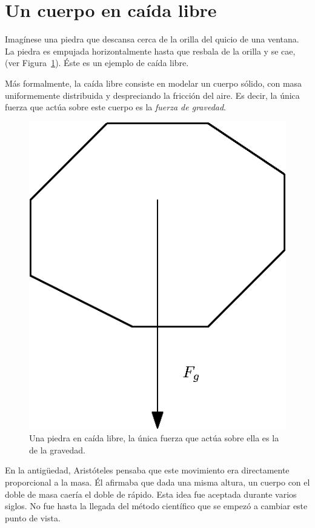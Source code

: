 \section{Un cuerpo en caída libre}
Imagínese una piedra que descansa cerca de la orilla del quicio de una ventana.
La piedra es empujada horizontalmente hasta que resbala de la orilla y se cae, (ver Figura~\ref{piedra:fig}).
Éste es un ejemplo de caída libre.

Más formalmente, la caída libre consiste en modelar un cuerpo sólido, con masa uniformemente distribuida y despreciando la fricción del aire.
Es decir, la única fuerza que actúa sobre este cuerpo es la \emph{fuerza de gravedad}.

\begin{figure}
 \centering
 \includegraphics[]{img/01/caida_libre}
 \caption[Ejemplo de caída libre]{ 
 Una piedra en caída libre, la única fuerza que actúa sobre ella es la de la gravedad.
 } \label{piedra:fig}
\end{figure}

En la antigüedad, Aristóteles pensaba que este movimiento era directamente proporcional a la masa.
Él afirmaba que dada una misma altura, un cuerpo con el doble de masa caería el doble de rápido.
Esta idea fue aceptada durante varios siglos.
No fue hasta la llegada del método científico que se empezó a cambiar este punto de vista.

